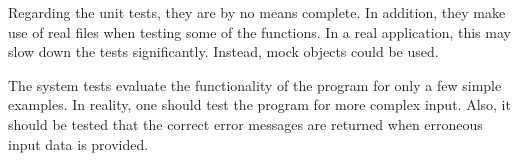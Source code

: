 \documentclass[12pt]{article}
\begin{document}
\vspace{0.2cm} 

Regarding the unit tests, they are by no means complete. In addition,
they make use of real files when testing some of the functions. In a
real application, this may slow down the tests significantly. Instead,
mock objects could be used.

\vspace{0.2cm} 

The system tests evaluate the functionality of the program for only a
few simple examples. In reality, one should test the program for more
complex input. Also, it should be tested that the correct error
messages are returned when erroneous input data is provided.
\end{document}
